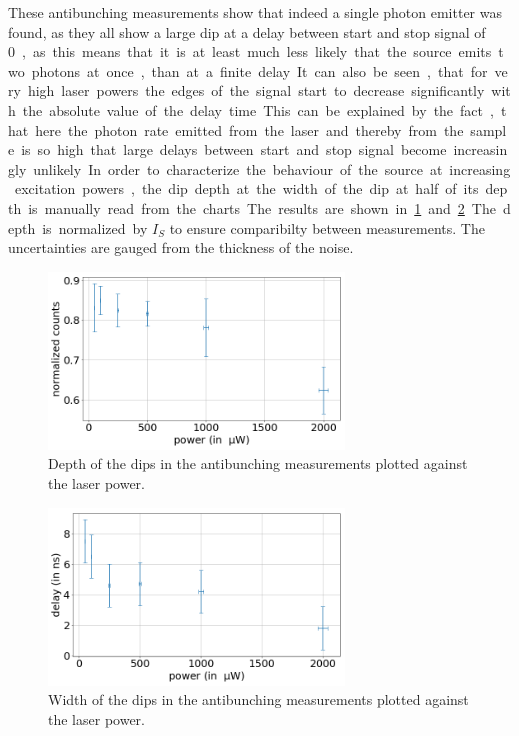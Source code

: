 These antibunching measurements show that indeed a single photon emitter was found, as they all show a large dip at a delay between start and stop signal of \SI{0}, as this means that it is at least much less likely that the source emits two photons at once, than at a finite delay.
It can also be seen, that for very high laser powers the edges of the signal start to decrease significantly with the absolute value of the delay time.
This can be explained by the fact, that here the photon rate emitted from the laser and thereby from the sample is so high that large delays between start and stop signal become increasingly unlikely.

In order to characterize the behaviour of the source at increasing excitation powers, the dip depth at the width of the dip at half of its depth is manually read from the charts.
The results are shown in \cref{fig_dip_depth} and \cref{fig_dip_width}.
The depth is normalized by $I_S$ to ensure comparibilty between measurements.
The uncertainties are gauged from the thickness of the noise.

\begin{figure}[!ht]
    \centering
    \includegraphics[width=0.7\textwidth]{img/output_t2/dip_depth.png}
    \caption{Depth of the dips in the antibunching measurements plotted against the laser power.}
    \label{fig_dip_depth}
\end{figure}

\begin{figure}[!ht]
    \centering
    \includegraphics[width=0.7\textwidth]{img/output_t2/dip_width.png}
    \caption{Width of the dips in the antibunching measurements plotted against the laser power.}
    \label{fig_dip_width}
\end{figure}

